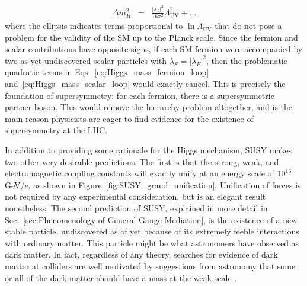 \documentclass[dissertation.tex]{subfiles}
\begin{document}
\begin{eqnarray}
\Delta m_{H}^{2} &=& \frac{|\lambda_{S}|^{2}}{16\pi^{2}}\Lambda_{\mathrm{UV}}^{2} + ...
\label{eq:Higgs_mass_scalar_loop}
\end{eqnarray}
%
where the ellipsis indicates terms proportional to $\ln\Lambda_{\mathrm{UV}}$ that do not pose a problem for the validity of the SM up to the Planck scale.  Since the fermion and scalar contributions have opposite signs, if each SM fermion were accompanied by two as-yet-undiscovered scalar particles with $\lambda_{S} = |\lambda_{F}|^{2}$, then the problematic quadratic terms in Eqs.~\ref{eq:Higgs_mass_fermion_loop} and~\ref{eq:Higgs_mass_scalar_loop} would exactly cancel.  This is precisely the foundation of supersymmetry: for each fermion, there is a supersymmetric partner boson.  This would remove the hierarchy problem altogether, and is the main reason physicists are eager to find evidence for the existence of supersymmetry at the LHC.

In addition to providing some rationale for the Higgs mechanism, SUSY makes two other very desirable predictions.  The first is that the strong, weak, and electromagnetic coupling constants will exactly unify at an energy scale of $10^{16}$ GeV/$c$, as shown in Figure~\ref{fig:SUSY_grand_unification}.  Unification of forces is not required by any experimental consideration, but is an elegant result nonetheless.  The second prediction of SUSY, explained in more detail in Sec.~\ref{sec:Phenomenology of General Gauge Mediation}, is the existence of a new stable particle, undiscovered as of yet because of its extremely feeble interactions with ordinary matter.  This particle might be what astronomers have observed as dark matter.  In fact, regardless of any theory, searches for evidence of dark matter at colliders are well motivated by suggestions from astronomy that some or all of the dark matter should have a mass at the weak scale \cite{Jungman1996195}.
\end{document}
